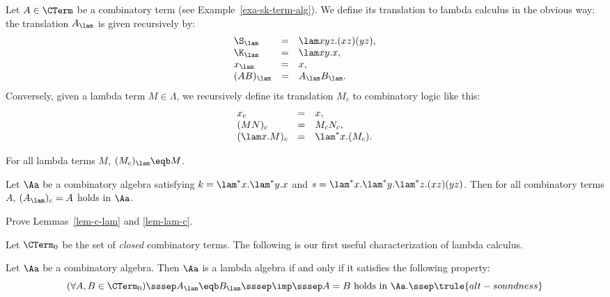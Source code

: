 \documentclass[12pt]{article}
\begin{document}
\begin{definition}
  Let $A\in\CTerm$ be a combinatory term (see
  Example~\ref{exa-sk-term-alg}). We define its translation to lambda
  calculus in the obvious way: the translation $A_\lam$ is given
  recursively by:
  \[\begin{array}{lll}
    \S_\lam &=& \lam xyz.(xz)(yz), \\
    \K_\lam &=& \lam xy.x, \\
    x_\lam &=& x, \\
    (AB)_\lam &=& A_\lam B_\lam.
  \end{array}
  \]
  Conversely, given a lambda term $M\in\Lambda$, we recursively define
  its translation $M_c$ to combinatory logic like this:
  \[\begin{array}{lll}
    x_c &=& x,\\
    (MN)_c &=& M_c N_c,\\
    (\lam x.M)_c &=& \lam^*x.(M_c).\\
  \end{array}
  \]
\end{definition}

\begin{lemma}\label{lem-c-lam}
  For all lambda terms $M$, $(M_c)_\lam \eqb M$.
\end{lemma}

\begin{lemma}\label{lem-lam-c}
  Let $\Aa$ be a combinatory algebra satisfying $k =
  \lam^*x.\lam^*y.x$ and $s = \lam^*x.\lam^*y.\lam^*z.(xz)(yz)$.  Then
  for all combinatory terms $A$, $(A_\lam)_c=A$ holds in $\Aa$.
\end{lemma}

\begin{exercise}
  Prove Lemmas~\ref{lem-c-lam} and {\ref{lem-lam-c}}.
\end{exercise}

Let $\CTerm_0$ be the set of {\em closed} combinatory terms.
The following is our first useful characterization of lambda calculus.

\begin{lemma}\label{lem-alt-soundness}
  Let $\Aa$ be a combinatory algebra. Then $\Aa$ is a lambda algebra
  if and only if it satisfies the following property:
  \[ (\forall A,B\in\CTerm_0)\sssep A_\lam \eqb B_\lam 
  \sssep\imp\sssep A=B\mbox{ holds in $\Aa$}.
  \ssep \trule{alt-soundness}
  \]
\end{lemma}
\end{document}

